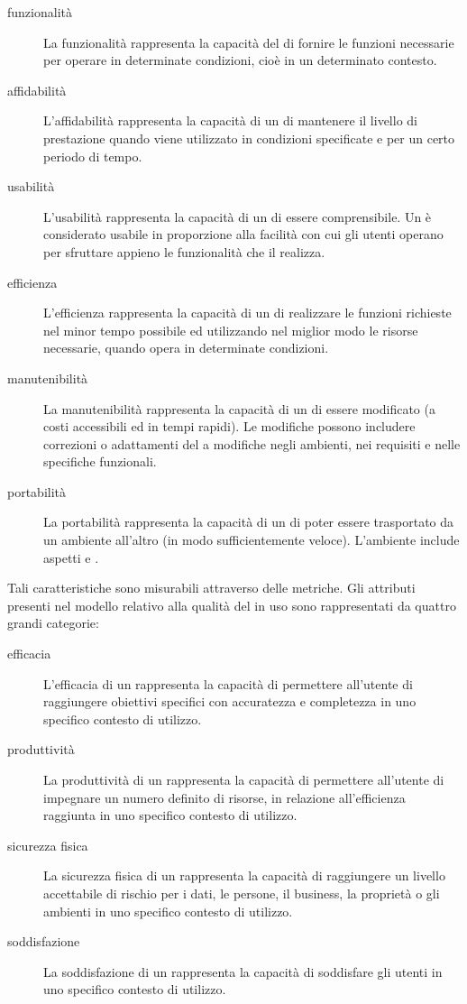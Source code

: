 			\begin{description}
				\item[funzionalità] La funzionalità rappresenta la capacità del  di fornire le funzioni necessarie per operare in determinate condizioni, cioè in un determinato contesto.
				\item[affidabilità] L'affidabilità rappresenta la capacità di un   di mantenere il livello di prestazione quando viene utilizzato in condizioni specificate e per un certo periodo di tempo.
				\item[usabilità] L'usabilità rappresenta la capacità di un   di essere comprensibile. Un  è considerato usabile in proporzione alla facilità con cui gli utenti operano per sfruttare appieno le funzionalità che il  realizza.
				\item[efficienza] L'efficienza rappresenta la capacità di un  di realizzare le funzioni richieste nel minor tempo possibile ed utilizzando nel miglior modo le risorse necessarie, quando opera in determinate condizioni.
				\item[manutenibilità] La manutenibilità rappresenta la capacità di un   di essere modificato (a costi accessibili ed in tempi rapidi). Le modifiche possono includere correzioni o adattamenti del  a modifiche negli ambienti, nei requisiti e nelle specifiche funzionali.
				\item[portabilità] La portabilità rappresenta la capacità di un   di poter essere trasportato da un ambiente all'altro (in modo sufficientemente veloce). L'ambiente include aspetti  e .
			\end{description}
			Tali caratteristiche sono misurabili attraverso delle metriche.
			Gli attributi presenti nel modello relativo alla qualità del  in uso sono rappresentati da quattro grandi categorie:
			\begin{description}
				\item[efficacia] L'efficacia di un   rappresenta la capacità di permettere all'utente di raggiungere obiettivi specifici con accuratezza e completezza in uno specifico contesto di utilizzo.
				\item[produttività] La produttività di un   rappresenta la capacità di permettere all'utente di impegnare un numero definito di risorse, in relazione all'efficienza raggiunta in uno specifico contesto di utilizzo.
				\item[sicurezza fisica] La sicurezza fisica di un   rappresenta la capacità di raggiungere un livello accettabile di rischio per i dati, le persone, il business, la proprietà o gli ambienti in uno specifico contesto di utilizzo.
				\item[soddisfazione] La soddisfazione di un   rappresenta la capacità di soddisfare gli utenti in uno specifico contesto di utilizzo.
			\end{description}
